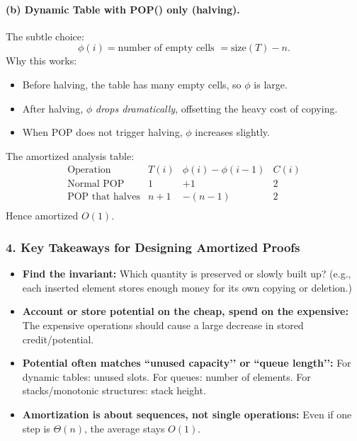 \documentclass[9pt]{extarticle}
\begin{document}
\paragraph{(b) Dynamic Table with POP() only (halving).}
The subtle choice:
\[
\phi(i) = \text{number of empty cells } = \text{size}(T) - n.
\]
Why this works:
\begin{itemize}
    \item Before halving, the table has many empty cells, so $\phi$ is large.
    \item After halving, $\phi$ \emph{drops dramatically}, offsetting the heavy
          cost of copying.
    \item When POP does not trigger halving, $\phi$ increases slightly.
\end{itemize}

The amortized analysis table:
\[
\begin{array}{c|c|c|c}
\text{Operation} & T(i) & \phi(i)-\phi(i-1) & C(i) \\
\hline
\text{Normal POP} & 1 & +1 & 2 \\
\text{POP that halves} & n+1 & -(n-1) & 2 \\
\end{array}
\]
Hence amortized $O(1)$.

\subsubsection*{4. Key Takeaways for Designing Amortized Proofs}

\begin{itemize}
    \item \textbf{Find the invariant:}  
          Which quantity is preserved or slowly built up?  
          (e.g., each inserted element stores enough money for its own copying or deletion.)

    \item \textbf{Account or store potential on the cheap, spend on the expensive:}  
          The expensive operations should cause a large decrease in stored credit/potential.

    \item \textbf{Potential often matches “unused capacity’’ or “queue length’’:}  
          For dynamic tables: unused slots.  
          For queues: number of elements.  
          For stacks/monotonic structures: stack height.

    \item \textbf{Amortization is about sequences, not single operations:}  
          Even if one step is $\Theta(n)$, the average stays $O(1)$.
\end{itemize}
\end{document}
